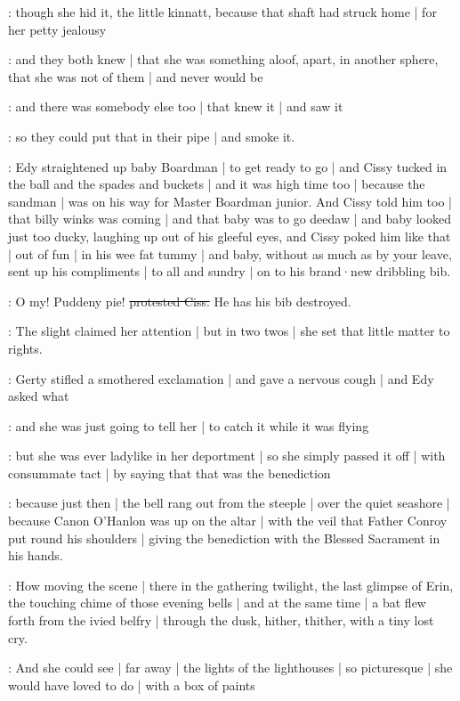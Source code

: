 \gertyJudgy:
though she hid it,
the little kinnatt,
because that shaft had struck home |
for her petty jealousy

\gertyNovel:
and they both knew |
that she was something aloof,
apart,
in another sphere,
that she was not of them |
and never would be

\gertySex:
and there was somebody else too |
that knew it |
and saw it

\gertyJudgy:
so they could put that in their pipe |
and smoke it.

:
Edy straightened up baby Boardman |
to get ready to go |
and Cissy tucked in
the ball and the spades and buckets |
and it was high time too |
because the sandman |
was on his way for Master Boardman junior.
And Cissy told him too |
that billy winks was coming |
and that baby was to go deedaw |
and baby looked just too ducky,
laughing up out of his gleeful eyes,
and Cissy poked him like that |%
out of fun |
in his wee fat tummy |
and baby,
without as much as by your leave,
sent up his compliments |
to all and sundry |
on to his brand·new dribbling bib.

\cissy:
O my!
Puddeny pie!
\sout{protested Ciss.}
He has his bib destroyed.

:
The slight 
claimed her attention |
but in two twos |
she set that little matter to rights.

\gertyReal:
Gerty stifled a smothered exclamation |
and gave a nervous cough |
and Edy asked what

\gertyJudgy:
and she was just going to tell her |
to catch it while it was flying

\gertyReal:
but she was ever ladylike in her deportment |
so she simply passed it off |
with consummate tact |
by saying that that was the benediction

\Nrelig:
because just then |
the bell rang out from the steeple |%
over the quiet seashore |
because Canon O'Hanlon
was up on the altar |
with the veil
that Father Conroy put round his shoulders |
giving the benediction
with the Blessed Sacrament in his hands.

:
How moving the scene |
there in the gathering twilight,
the last glimpse of Erin,
the touching chime of those evening bells |
and at the same time |
a bat
flew forth from the ivied belfry |
through the dusk,
hither,
thither,
with a tiny lost cry.

\gertyNovel:
And she could see |
far away |
the lights of the lighthouses |
so picturesque |
she would have loved to do |
with a box of paints

